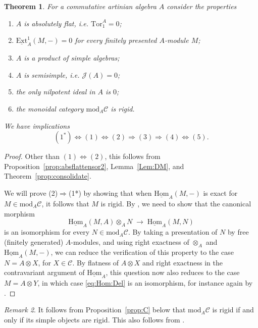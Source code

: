 \documentclass[11pt]{amsart}
\newcommand{\uHom}{\underline{\mathrm{Hom}}}
\def\JJ{\mathcal{J}}
\def\cC{\mathscr{C}}
\def\mod{\mathrm{ mod}}
\def\Ext{\mathrm{Ext}}
\def\Tor{\mathrm{Tor}}
\newtheorem{thm}{Theorem}[section]
\theoremstyle{definition}
\theoremstyle{remark}
\newtheorem{remark}[thm]{Remark}
\numberwithin{equation}{section}
\newcommand{\uExt}{\underline{\Ext}}
\begin{document}
\begin{thm}
\label{prop:consolidate2}  
For a commutative artinian algebra $A$ consider the properties
    \begin{enumerate}
     \item $A$ is absolutely flat, i.e. $\Tor_1^A=0$;
     \item $\uExt^1_A(M,-)=0$ for every finitely presented $A$-module $M$;
    \item $A$ is a product of simple algebras; 
        \item $A$ is semisimple, i.e. $\JJ(A)=0$;
        \item the only nilpotent ideal in $A$ is $0$;
        
        
       
         \item[(1*)] the monoidal category $\mod_A\cC$ is rigid.
        
        
        \end{enumerate}
        We have implications 
        $$(1^*)\Leftrightarrow(1)\Leftrightarrow(2)\Rightarrow(3)\Rightarrow (4)\Leftrightarrow (5).$$
\end{thm}
\begin{proof}
    Other than $(1)\Leftrightarrow(2)$, this follows from Proposition~\ref{prop:absflattensor2}, Lemma~\ref{Lem:DM}, and Theorem~\ref{prop:consolidate}.
    
    We will prove (2)$\Rightarrow$(1*) by showing that when $\uHom_A(M,-)$ is exact for $M\in\mod_A{\cC}$, it follows that $M$ is rigid. By \cite[Proposition~2.3]{Del90}, we need to show that the canonical morphism
    \begin{equation}\label{eq:Hom:Del}\uHom_A(M,A)\otimes_AN\;\to\; \uHom_A(M,N)\end{equation}
    is an isomorphism for every $N\in\mod_A{\cC}$. By taking a presentation of $N$ by free (finitely generated) $A$-modules, and using right exactness of $\otimes_A$ and $\uHom_A(M,-)$, we can reduce the verification of this property to the case $N=A\otimes X$, for $X\in\cC$. By flatness of $A\otimes X$ and right exactness in the contravariant argument of $\uHom_A$, this question now also reduces to the case $M=A\otimes Y$, in which case \eqref{eq:Hom:Del} is an isomorphism, for instance again by \cite[Proposition~2.3]{Del90}.
\end{proof}


   \begin{remark}
       It follows from Proposition~\ref{prop:C} below that $\mod_A\cC$ is rigid if and only if its simple objects are rigid. This also follows from \cite[Corollary~4.7]{EP}.
   \end{remark}
\end{document}
